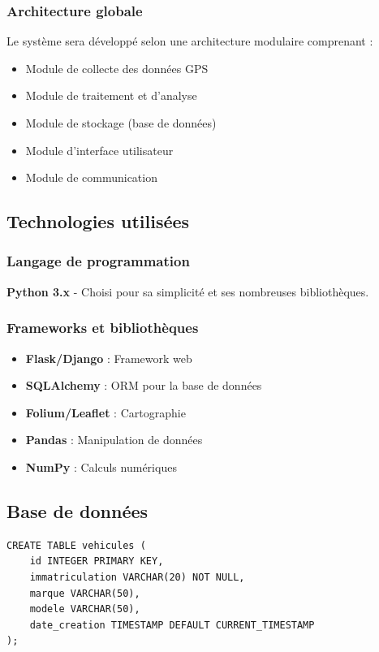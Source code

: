 \documentclass[12pt,a4paper]{article}
\begin{document}
\lipsum[9]

\subsubsection{Architecture globale}
Le système sera développé selon une architecture modulaire comprenant :
\begin{itemize}
    \item Module de collecte des données GPS
    \item Module de traitement et d'analyse
    \item Module de stockage (base de données)
    \item Module d'interface utilisateur
    \item Module de communication
\end{itemize}

\subsection{Technologies utilisées}

\subsubsection{Langage de programmation}
\textbf{Python 3.x} - Choisi pour sa simplicité et ses nombreuses bibliothèques.

\subsubsection{Frameworks et bibliothèques}
\begin{itemize}
    \item \textbf{Flask/Django} : Framework web
    \item \textbf{SQLAlchemy} : ORM pour la base de données
    \item \textbf{Folium/Leaflet} : Cartographie
    \item \textbf{Pandas} : Manipulation de données
    \item \textbf{NumPy} : Calculs numériques
\end{itemize}

\subsection{Base de données}

\lipsum[10]

\begin{lstlisting}[caption=Exemple de structure de table véhicule]
CREATE TABLE vehicules (
    id INTEGER PRIMARY KEY,
    immatriculation VARCHAR(20) NOT NULL,
    marque VARCHAR(50),
    modele VARCHAR(50),
    date_creation TIMESTAMP DEFAULT CURRENT_TIMESTAMP
);
\end{lstlisting}
\end{document}
